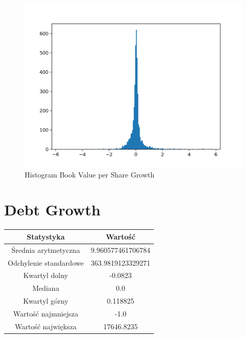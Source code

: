 \documentclass{article}
\begin{document}
\begin{figure}[h!]
    \includegraphics[width=\linewidth]{variables/Book Value per Share Growth.png}
    \caption{Histogram Book Value per Share Growth }
\end{figure}\section{ Debt Growth }

\begin{center}
    \begin{tabular}{|c | c|} 
    \hline
    Statystyka & Wartość \\
    \hline\hline
    Średnia arytmetyczna & 9.960577461706784 \\ 
    \hline
    Odchylenie standardowe & 363.9819123329271 \\
    \hline
    Kwartyl dolny & -0.0823 \\
    \hline
    Mediana & 0.0 \\
    \hline
    Kwartyl górny & 0.118825 \\
    \hline
    Wartość najmniejsza & -1.0 \\
    \hline
    Wartość największa & 17646.8235 \\
    \hline
   \end{tabular}
\end{center}
\end{document}
